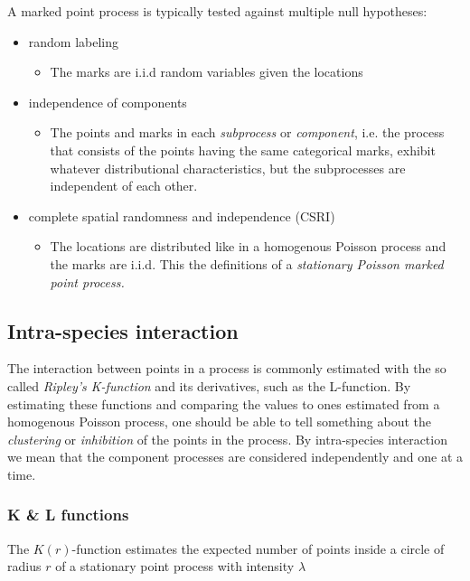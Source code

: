 \documentclass[12pt,a4paper,oneside,article]{memoir}
\begin{document}
A marked point process is typically tested against multiple null hypotheses:
\begin{itemize}
  \item random labeling
  	\begin{itemize}
  		\item The marks are i.i.d random variables given the locations
	\end{itemize}
	\item independence of components
	\begin{itemize}
  		\item The points and marks in each \emph{subprocess} or \emph{component}, i.e. the process that consists of the
  		points having the same categorical marks, exhibit whatever distributional characteristics, but the subprocesses are independent of each
  		other.
	\end{itemize}
	\item complete spatial randomness and independence (CSRI)
	\begin{itemize}
  		\item The locations are distributed like in a homogenous Poisson process and the marks
  		are i.i.d. This the definitions of a \emph{stationary Poisson marked point process.} 
	\end{itemize}
\end{itemize}

\subsection{Intra-species interaction}

The interaction between points in a process is commonly estimated
with the so called \emph{Ripley's K-function} and its derivatives,
such as the L-function. By estimating these functions and comparing
the values to ones estimated from a homogenous Poisson process, one
should be able to tell something about the \emph{clustering} or \emph{inhibition}
of the points in the process. By intra-species interaction we mean that
the component processes are considered independently and one at a time.

\subsubsection{K \& L functions}

The $K(r)$-function estimates the expected number of points
inside a circle of radius $r$ of a stationary point process with intensity $\lambda$
\end{document}
